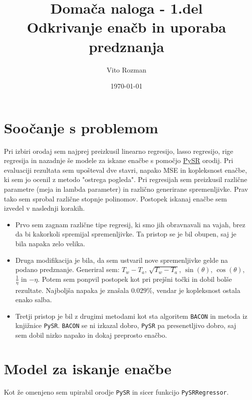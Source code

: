 \documentclass[12pt]{article}
\title{Domača naloga - 1.del \\
\large Odkrivanje enačb in uporaba predznanja}
\begin{document}
    
\author{Vito Rozman}
\date{\today}
\maketitle



\section{Soočanje s problemom}

Pri izbiri orodaj sem najprej preizkusil linearno regresijo, lasso regresijo, 
rige regresija in nazadnje še modele za iskane enačbe s pomočjo 
\href{https://github.com/MilesCranmer/PySR}{PySR} orodij.
Pri evaluaciji rezultata sem upošteval dve stavri, napako MSE in kopleksnost
enačbe, ki sem jo ocenil z metodo "ostrega pogleda". Pri regresijah sem preizkusil
različne parametre (meja in lambda parameter) in različno generirane spremenljivke. 
Prav tako sem sprobal različne stopnje polinomov.
Postopek iskanaj enačbe sem izvedel v naslednji korakih.
\begin{itemize}
    \item Prvo sem zagnam različne tipe regresij, ki smo 
    jih obravnavali na vajah, brez da bi kakorkoli spremijal spremenljivke.
    Ta pristop se je bil obupen, saj je bila napaka zelo velika.
    \item Druga modifikacija je bila, da sem ustvaril nove spremenljivke 
    gelde na podano predznanje. Generiral sem:
    $T_w - T_a$, $\sqrt{T_w - T_a}$, $\sin(\theta)$,  $\cos(\theta)$, 
    $\frac{1}{\eta}$ in $-\eta$.
    Potem sem ponpvil postopek kot pri 
    prejšni točki in dobil bolše rezultate. Najboljša napaka je znašala $0.029\%$,
    vendar je kopleksnost ostala enako salba.
    \item Tretji pristop je bil z drugimi metodami kot sta algoritem \texttt{BACON} 
    in metoda iz knjižnice \texttt{PySR}. \texttt{BACON} se ni izkazal dobro, \texttt{PySR}
    pa presenetljivo dobro, saj sem dobil nizko napako in dokaj preprosto enačbo.
\end{itemize}


\section{Model za iskanje enačbe}
Kot že omenjeno sem upirabil orodje \texttt{PySR} in sicer funkcijo 
\texttt{PySRRegressor}.
\end{document}
